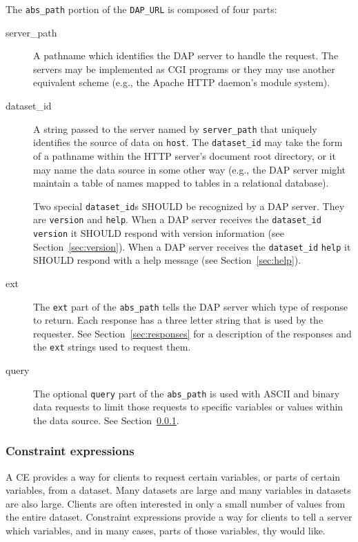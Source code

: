 \documentclass{article}
\begin{document}
The \texttt{abs\_path} portion of the \texttt{DAP\_URL} is composed of four
parts:
\begin{description}
\item [server\_path] A pathname which identifies the \ac{DAP} server to
  handle the request. The servers may be implemented as \ac{CGI} programs or
  they may use another equivalent scheme (e.g., the Apache \ac{HTTP} daemon's
  module system).
\item [dataset\_id] A string passed to the server named by
  \texttt{server\_path} that uniquely identifies the source of data on
  \texttt{host}. The \texttt{dataset\_id} may take the form of a pathname
  within the \ac{HTTP} server's document root directory, or it may name the
  data source in some other way (e.g., the \ac{DAP} server might maintain a
  table of names mapped to tables in a relational database).
  
  Two special \texttt{dataset\_id}s SHOULD be recognized by a \ac{DAP}
  server. They are \texttt{version} and \texttt{help}. When a \ac{DAP} server
  receives the \texttt{dataset\_id} \texttt{version} it SHOULD respond
  with version information (see Section~\ref{sec:version}). When a \ac{DAP}
  server receives the \texttt{dataset\_id} \texttt{help} it SHOULD respond
  with a help message (see Section~\ref{sec:help}).
\item [ext] The \texttt{ext} part of the \texttt{abs\_path} tells the
  \ac{DAP} server which type of response to return. Each response has a three
  letter string that is used by the requester. See
  Section~\ref{sec:responses} for a description of the responses and the
  \texttt{ext} strings used to request them.
\item [query] The optional \texttt{query} part of the \texttt{abs\_path} is
  used with ASCII and binary data requests to limit those requests to
  specific variables or values within the data source. See
  Section~\ref{sec:ce}.
\end{description}

\subsubsection{Constraint expressions}
\label{sec:ce}

A \ac{CE} provides a way for clients to request certain
variables, or parts of certain variables, from a dataset. Many datasets are
large and many variables in datasets are also large. Clients are often
interested in only a small number of values from the entire dataset.
Constraint expressions provide a way for clients to tell a server which
variables, and in many cases, parts of those variables, thy would like.
\end{document}
